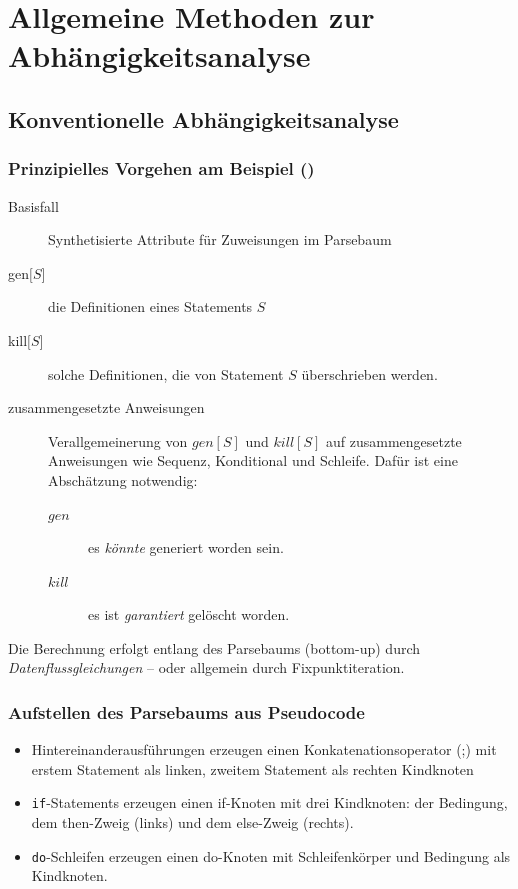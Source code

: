 
\section{Allgemeine Methoden zur Abhängigkeitsanalyse}
\subsection{Konventionelle Abhängigkeitsanalyse} %
\label{sec:konventionelle_abhaengigkeitsanalyse}

\subsubsection{Prinzipielles Vorgehen am Beispiel ()}
\label{ssub:prinzipielles_vorgehen_am_beispiel}

\begin{description}
\item[Basisfall] Synthetisierte Attribute für Zuweisungen im Parsebaum
\item[gen$\lbrack S \rbrack$] die Definitionen eines Statements $S$
\item[kill$\lbrack S \rbrack$] solche Definitionen, die von Statement $S$ überschrieben werden.
\item[zusammengesetzte Anweisungen] Verallgemeinerung von $gen[S]$ und $kill[S]$ auf zusammengesetzte Anweisungen wie Sequenz, Konditional und Schleife.
  Dafür ist eine Abschätzung notwendig:
  \begin{description}
    \item[$gen$] es \emph{könnte} generiert worden sein.
    \item[$kill$] es ist \emph{garantiert} gelöscht worden.
  \end{description}
\end{description}

Die Berechnung erfolgt entlang des Parsebaums (bottom-up) durch \emph{Datenflussgleichungen} -- oder allgemein durch Fixpunktiteration.

\subsubsection{Aufstellen des Parsebaums aus Pseudocode}

\begin{itemize}
    \item Hintereinanderausführungen erzeugen einen Konkatenationsoperator (;) mit
        erstem Statement als linken, zweitem Statement als rechten Kindknoten
    \item \texttt{if}-Statements erzeugen einen if-Knoten mit drei Kindknoten:
        der Bedingung, dem then-Zweig (links) und dem else-Zweig (rechts).
    \item \texttt{do}-Schleifen erzeugen einen do-Knoten mit Schleifenkörper und
        Bedingung als Kindknoten.
\end{itemize}

